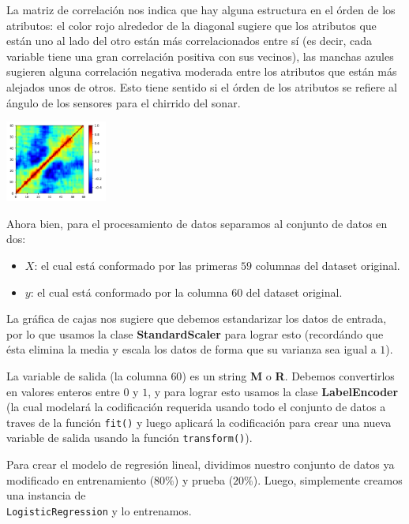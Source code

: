 \documentclass[letterpaper,11pt]{article}
\begin{document}
\begin{enumerate}
    La matriz de correlación nos indica que hay alguna estructura en el órden 
    de los atributos: el color rojo alrededor de la diagonal sugiere que los 
    atributos que están uno al lado del otro están más correlacionados entre 
    sí (es decir, cada variable tiene una gran correlación positiva con sus 
    vecinos), las manchas azules sugieren alguna correlación negativa moderada 
    entre los atributos que están más alejados unos de otros. Esto tiene 
    sentido si el órden de los atributos se refiere al ángulo de los sensores 
    para el chirrido del sonar.
    \begin{center}
        \includegraphics[width=0.25\textwidth]{imagenes/sonar-correlacion.png}
    \end{center}

    Ahora bien, para el procesamiento de datos separamos al conjunto de datos 
    en dos:
    \begin{itemize}
        \item $X$: el cual está conformado por las primeras $59$ columnas del 
        dataset original.
        \item $y$: el cual está conformado por la columna $60$ del dataset 
        original.
    \end{itemize}

    La gráfica de cajas nos sugiere que debemos estandarizar los datos de 
    entrada, por lo que usamos la clase \textbf{StandardScaler} para lograr 
    esto (recordándo que ésta elimina la media y escala los datos de forma que 
    su varianza sea igual a $1$). 

    La variable de salida (la columna $60$) es un string \textbf{M} o \textbf{R}.
    Debemos convertirlos en valores enteros entre $0$ y $1$, y para lograr esto 
    usamos la clase \textbf{LabelEncoder} (la cual modelará la codificación 
    requerida usando todo el conjunto de datos a traves de la función 
    \texttt{fit()} y luego aplicará la codificación para crear una nueva variable 
    de salida usando la función \texttt{transform()}).

    Para crear el modelo de regresión lineal, dividimos nuestro conjunto de datos 
    ya modificado en entrenamiento ($80\%$) y prueba ($20\%$). Luego, simplemente 
    creamos una instancia de \\ 
    \texttt{LogisticRegression}  y lo entrenamos.


\end{enumerate}
\end{document}
